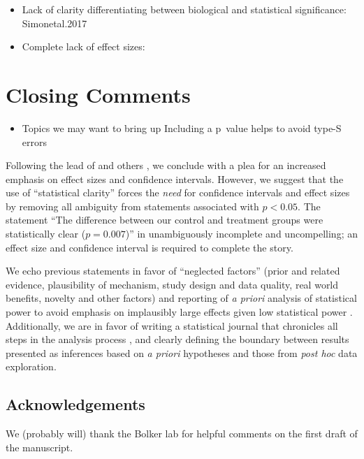 \begin{itemize}
  \item Lack of clarity differentiating between biological and statistical significance: {Simonetal.2017}
  \item Complete lack of effect sizes: \citep{Juriadoetal.2017}
\end{itemize}

\section*{Closing Comments}

\begin{itemize}
  \item Topics we may want to bring up
	  \subitem Including a p~value helps to avoid type-S errors
\end{itemize}

Following the lead of \citet{Cohen1994} and others \citep{Goodman1999, ZiliakandMcCloskey2008, WassersteinandLazar2016},
we conclude with a plea for an increased emphasis on effect sizes and confidence intervals. However, we suggest that the
use of ``statistical clarity'' forces the \emph{need} for confidence intervals and effect sizes by removing all ambiguity
from statements associated with $p < 0.05$. The statement ``The difference between our control and treatment groups were
statistically clear ($p = 0.007$)'' in unambiguously incomplete and uncompelling; an effect size and confidence interval 
is required to complete the story.


We echo previous statements in favor of ``neglected factors'' (prior and related evidence, plausibility of mechanism, 
study design and data quality, real world benefits, novelty and other factors) \citep{McShaneetal.2017} and 
reporting of \emph{a priori} analysis of statistical power to avoid emphasis on implausibly large effects given low 
statistical power \citep[the "winners curse"][]{GelmanandCarlin2014, SzucsandIoannidis2017, Bernardietal.2017}. 
Additionally, we are in favor of writing a statistical journal that chronicles all steps in the analysis process 
\citep{Kassetal.2016}, and clearly defining the boundary between results presented as inferences based on \emph{a priori}
hypotheses and those from \emph{post hoc} data exploration. 

\subsection*{Acknowledgements}

We (probably will) thank the Bolker lab for helpful comments on the first draft of the manuscript. 

